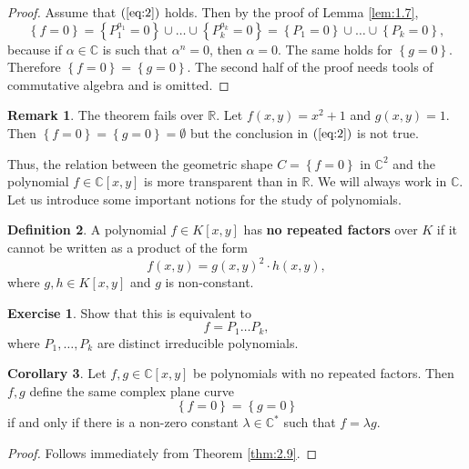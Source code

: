 \documentclass{article}
\newcommand{\R}{\mathbb{R}}
\newcommand{\C}{\mathbb{C}}
\newcommand{\rb}[1]{\left( #1 \right)}
\renewcommand{\sb}[1]{\left[ #1 \right]}
\newcommand{\cb}[1]{\left\{ #1 \right\}}
\theoremstyle{definition}\newtheorem{definition}{Definition}[section]
\theoremstyle{definition}\newtheorem{notation}[definition]{Notation}
\theoremstyle{definition}\newtheorem{remark}[definition]{Remark}
\theoremstyle{definition}\newtheorem{example}[definition]{Example}
\theoremstyle{definition}\newtheorem{fact}{Fact}
\theoremstyle{definition}\newtheorem{exercise}{Exercise}
\newtheorem{corollary}[definition]{Corollary}
\begin{document}

\begin{proof}
Assume that $ \rb{\ref{eq:2}} $ holds. Then by the proof of Lemma \ref{lem:1.7},
$$ \cb{f = 0} = \cb{P_1^{a_1} = 0} \cup \dots \cup \cb{P_k^{a_k} = 0} = \cb{P_1 = 0} \cup \dots \cup \cb{P_k = 0}, $$
because if $ \alpha \in \C $ is such that $ \alpha^n = 0 $, then $ \alpha = 0 $. The same holds for $ \cb{g = 0} $. Therefore $ \cb{f = 0} = \cb{g = 0} $. The second half of the proof needs tools of commutative algebra and is omitted.
\end{proof}

\begin{remark}
The theorem fails over $ \R $. Let $ f\rb{x, y} = x^2 + 1 $ and $ g\rb{x, y} = 1 $. Then $ \cb{f = 0} = \cb{g = 0} = \emptyset $ but the conclusion in $ \rb{\ref{eq:2}} $ is not true.
\end{remark}

Thus, the relation between the geometric shape $ C = \cb{f = 0} $ in $ \C^2 $ and the polynomial $ f \in \C\sb{x, y} $ is more transparent than in $ \R $. We will always work in $ \C $. Let us introduce some important notions for the study of polynomials.

\begin{definition}
A polynomial $ f \in K\sb{x, y} $ has \textbf{no repeated factors} over $ K $ if it cannot be written as a product of the form
$$ f\rb{x, y} = g\rb{x, y}^2 \cdot h\rb{x, y}, $$
where $ g, h \in K\sb{x, y} $ and $ g $ is non-constant.
\end{definition}

\begin{exercise}
Show that this is equivalent to
$$ f = P_1 \dots P_k, $$
where $ P_1, \dots, P_k $ are distinct irreducible polynomials.
\end{exercise}

\begin{corollary}
Let $ f, g \in \C\sb{x, y} $ be polynomials with no repeated factors. Then $ f, g $ define the same complex plane curve
$$ \cb{f = 0} = \cb{g = 0} $$
if and only if there is a non-zero constant $ \lambda \in \C^* $ such that $ f = \lambda g $.
\end{corollary}

\begin{proof}
Follows immediately from Theorem \ref{thm:2.9}.
\end{proof}
\end{document}
